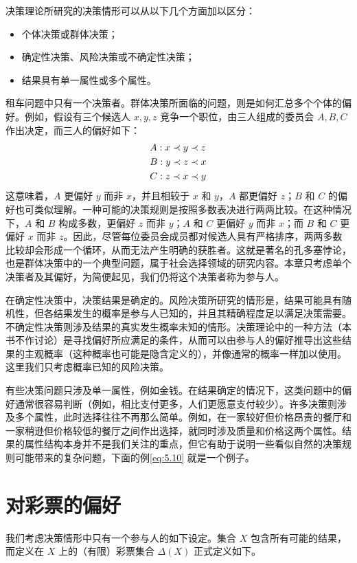 决策理论所研究的决策情形可以从以下几个方面加以区分：
\begin{itemize}
\item 个体决策或群体决策；
\item 确定性决策、风险决策或不确定性决策；
\item 结果具有单一属性或多个属性。
\end{itemize}

租车问题中只有一个决策者。群体决策所面临的问题，则是如何汇总多个个体的偏好。例如，假设有三个候选人 \(x,y,z\) 竞争一个职位，由三人组成的委员会 \(A,B,C\) 作出决定，而三人的偏好如下：
\begin{align}
&A : x \prec  y \prec  z \notag \\
&B : y \prec  z \prec  x \label{eq:5.3} \\
&C : z \prec  x \prec  y   \notag
\end{align}
这意味着，\(A\) 更偏好 \(y\) 而非 \(x\)，并且相较于 \(x\) 和 \(y\)，\(A\) 都更偏好 \(z\)；\(B\) 和 \(C\) 的偏好也可类似理解。一种可能的决策规则是按照多数表决进行两两比较。在这种情况下，\(A\) 和 \(B\) 构成多数，更偏好 \(z\) 而非 \(y\)；\(A\) 和 \(C\) 更偏好 \(y\) 而非 \(x\)；而 \(B\) 和 \(C\) 更偏好 \(x\) 而非 \(z\)。因此，尽管每位委员会成员都对候选人具有严格排序，两两多数比较却会形成一个循环，从而无法产生明确的获胜者。这就是著名的孔多塞悖论，也是群体决策中的一个典型问题，属于社会选择领域的研究内容。本章只考虑单个决策者及其偏好，为简便起见，我们仍将这个决策者称为参与人。

在确定性决策中，决策结果是确定的。风险决策所研究的情形是，结果可能具有随机性，但各结果发生的概率是参与人已知的，并且其精确程度足以满足决策需要。不确定性决策则涉及结果的真实发生概率未知的情形。决策理论中的一种方法（本书不作讨论）是寻找偏好所应满足的条件，从而可以由参与人的偏好推导出这些结果的主观概率（这种概率也可能是隐含定义的），并像通常的概率一样加以使用。这里我们只考虑概率已知的风险决策。

有些决策问题只涉及单一属性，例如金钱。在结果确定的情况下，这类问题中的偏好通常很容易判断（例如，相比支付更多，人们更愿意支付较少）。许多决策则涉及多个属性，此时选择往往不再那么简单。例如，在一家较好但价格昂贵的餐厅和一家稍逊但价格较低的餐厅之间作出选择，就同时涉及质量和价格这两个属性。结果的属性结构本身并不是我们关注的重点，但它有助于说明一些看似自然的决策规则可能带来的复杂问题，下面的例\eqref{eq:5.10} 就是一个例子。

\section{对彩票的偏好}\label{sec:5.4}
我们考虑决策情形中只有一个参与人的如下设定。集合 \(X\) 包含所有可能的结果，而定义在 \(X\) 上的（有限）彩票集合 \(\Delta(X)\) 正式定义如下。

